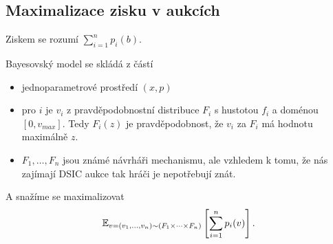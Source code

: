 \subsection{Maximalizace zisku v aukcích}
\begin{definition}\label{def:revenue}
    Ziskem se rozumí $\sum^n_{i=1} p_i(b)$. 
\end{definition}
\begin{definition}\label{def:bayes}
  Bayesovský model se skládá z částí 
  \begin{itemize}
    \item jednoparametrové prostředí $(x,p)$
    \item pro $i$ je $v_i$ z pravděpodobnostní distribuce $F_i$ s hustotou $f_i$ a doménou $[0,v_{max}]$. 
        Tedy $F_i(z)$ je pravděpodobnost, že $v_i$ za $F_i$ má hodnotu maximálně $z$. 
    \item $F_1,\dots,F_n$ jsou známé návrháři mechanismu, ale vzhledem k tomu, že nás zajímají DSIC aukce tak hráči je nepotřebují znát. 
  \end{itemize} 
  A snažíme se maximalizovat 
  \[
      \E[v=(v_1,\dots,v_n) \sim (F_1\times \cdots \times F_n)]{\sum^n_{i=1} p_i(v)}. 
  \]
\end{definition}


